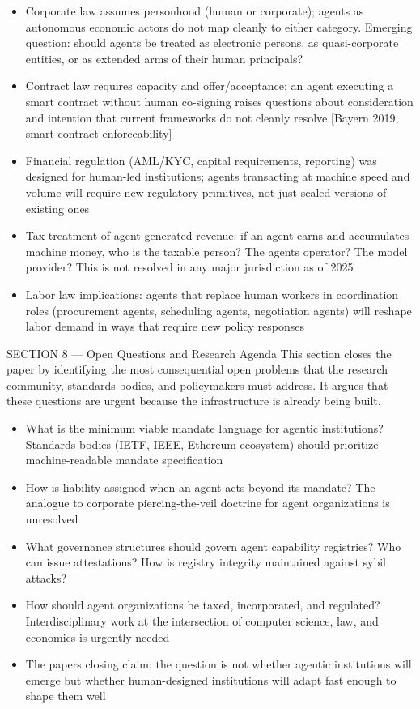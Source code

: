 \documentclass[
]{article}
\providecommand{\tightlist}{%
  \setlength{\itemsep}{0pt}\setlength{\parskip}{0pt}}
\begin{document}
\begin{itemize}
\tightlist
\item
  Corporate law assumes personhood (human or corporate); agents as
  autonomous economic actors do not map cleanly to either category.
  Emerging question: should agents be treated as electronic persons, as
  quasi-corporate entities, or as extended arms of their human
  principals?
\item
  Contract law requires capacity and offer/acceptance; an agent
  executing a smart contract without human co-signing raises questions
  about consideration and intention that current frameworks do not
  cleanly resolve {[}Bayern 2019, smart-contract enforceability{]}
\item
  Financial regulation (AML/KYC, capital requirements, reporting) was
  designed for human-led institutions; agents transacting at machine
  speed and volume will require new regulatory primitives, not just
  scaled versions of existing ones
\item
  Tax treatment of agent-generated revenue: if an agent earns and
  accumulates machine money, who is the taxable person? The
  agent\textquotesingle s operator? The model provider? This is not
  resolved in any major jurisdiction as of 2025
\item
  Labor law implications: agents that replace human workers in
  coordination roles (procurement agents, scheduling agents, negotiation
  agents) will reshape labor demand in ways that require new policy
  responses
\end{itemize}

SECTION 8 --- Open Questions and Research Agenda This section closes the
paper by identifying the most consequential open problems that the
research community, standards bodies, and policymakers must address. It
argues that these questions are urgent because the infrastructure is
already being built.

\begin{itemize}
\tightlist
\item
  What is the minimum viable mandate language for agentic institutions?
  Standards bodies (IETF, IEEE, Ethereum ecosystem) should prioritize
  machine-readable mandate specification
\item
  How is liability assigned when an agent acts beyond its mandate? The
  analogue to corporate piercing-the-veil doctrine for agent
  organizations is unresolved
\item
  What governance structures should govern agent capability registries?
  Who can issue attestations? How is registry integrity maintained
  against sybil attacks?
\item
  How should agent organizations be taxed, incorporated, and regulated?
  Interdisciplinary work at the intersection of computer science, law,
  and economics is urgently needed
\item
  The paper\textquotesingle s closing claim: the question is not whether
  agentic institutions will emerge but whether human-designed
  institutions will adapt fast enough to shape them well
\end{itemize}
\end{document}
